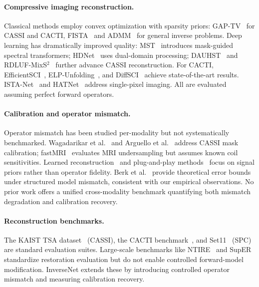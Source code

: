 \documentclass[runningheads]{llncs}
\begin{document}
\paragraph{Compressive imaging reconstruction.}
Classical methods employ convex optimization with sparsity priors: GAP-TV~\cite{yuan2016gaptv} for CASSI and CACTI, FISTA~\cite{beck2009fista} and ADMM~\cite{boyd2011admm} for general inverse problems.
Deep learning has dramatically improved quality: MST~\cite{cai2022mst} introduces mask-guided spectral transformers; HDNet~\cite{hu2022hdnet} uses dual-domain processing; DAUHST~\cite{cai2022dauhst} and RDLUF-MixS$^2$~\cite{li2023rdluf} further advance CASSI reconstruction.
For CACTI, EfficientSCI~\cite{wang2023efficientsci}, ELP-Unfolding~\cite{yang2022elp}, and DiffSCI~\cite{meng2024diffsci} achieve state-of-the-art results.
ISTA-Net~\cite{zhang2018istanet} and HATNet~\cite{qu2024hatnet} address single-pixel imaging.
All are evaluated assuming perfect forward operators.

\paragraph{Calibration and operator mismatch.}
Operator mismatch has been studied per-modality but not systematically benchmarked.
Wagadarikar et al.~\cite{wagadarikar2008cassi} and Arguello et al.~\cite{arguello2013cassi_calib} address CASSI mask calibration; fastMRI~\cite{zbontar2018fastmri} evaluates MRI undersampling but assumes known coil sensitivities.
Learned reconstruction~\cite{adler2018learned} and plug-and-play methods~\cite{ryu2019pnp} focus on signal priors rather than operator fidelity.
Berk et al.~\cite{berk2024robust} provide theoretical error bounds under structured model mismatch, consistent with our empirical observations.
No prior work offers a unified cross-modality benchmark quantifying both mismatch degradation and calibration recovery.

\paragraph{Reconstruction benchmarks.}
The KAIST TSA dataset~\cite{choi2017kaist} (CASSI), the CACTI benchmark~\cite{yuan2021snapshot}, and Set11~\cite{kulkarni2016reconnet} (SPC) are standard evaluation suites.
Large-scale benchmarks like NTIRE~\cite{timofte2017ntire} and SupER~\cite{kohler2020super} standardize restoration evaluation but do not enable controlled forward-model modification.
InverseNet extends these by introducing controlled operator mismatch and measuring calibration recovery.
\end{document}
